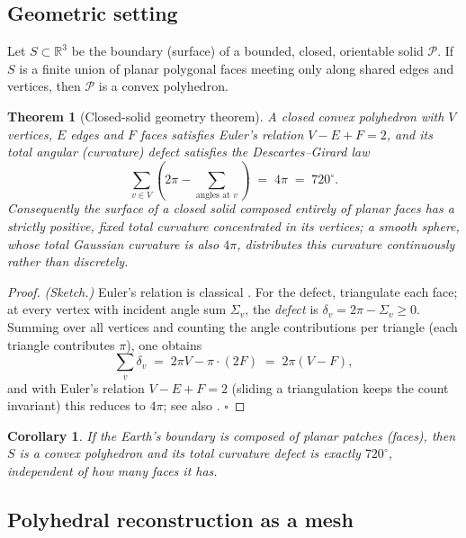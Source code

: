 \documentclass[11pt,a4paper]{article}
\newtheorem{theorem}{Theorem}
\newtheorem{corollary}{Corollary}
\newcommand{\R}{\mathbb{R}}
\begin{document}
\subsection{Geometric setting}
\label{sec:closed-solid}

Let $S\subset\R^3$ be the boundary (surface) of a bounded, closed, orientable solid $\mathcal{P}$. If $S$ is a finite union of planar polygonal faces meeting only along shared edges and vertices, then $\mathcal{P}$ is a convex polyhedron.

\begin{theorem}[Closed-solid geometry theorem]
\label{thm:defect}
A closed convex polyhedron with $V$ vertices, $E$ edges and $F$ faces satisfies Euler's relation $V - E + F = 2$, and its total angular (curvature) defect satisfies the Descartes--Girard law
\begin{equation}
\sum_{v\in V}\left(2\pi - \sum_{\text{angles at }v}\right) \;=\; 4\pi \;=\; 720^\circ .
\label{eq:defect}
\end{equation}
Consequently the surface of a closed solid composed entirely of planar faces has a strictly positive, fixed total curvature concentrated in its vertices; a smooth sphere, whose total Gaussian curvature is also $4\pi$, distributes this curvature continuously rather than discretely.
\end{theorem}

\begin{proof}
\emph{(Sketch.)} Euler's relation is classical \cite{euler1758}. For the defect, triangulate each face; at every vertex with incident angle sum $\Sigma_v$, the \emph{defect} is $\delta_v=2\pi-\Sigma_v\ge 0$. Summing over all vertices and counting the angle contributions per triangle (each triangle contributes $\pi$), one obtains
\[
\sum_v \delta_v \;=\; 2\pi V - \pi\cdot(2F) \;=\; 2\pi(V - F),
\]
and with Euler's relation $V - E + F=2$ (sliding a triangulation keeps the count invariant) this reduces to $4\pi$; see also \cite{descartes1630}. $\square$
\end{proof}

\begin{corollary}
\label{cor:poly}
If the Earth's boundary is composed of planar patches (faces), then $S$ is a convex polyhedron and its total curvature defect is exactly $720^\circ$, independent of how many faces it has.
\end{corollary}

\subsection{Polyhedral reconstruction as a mesh}
\label{sec:mesh}
\end{document}
